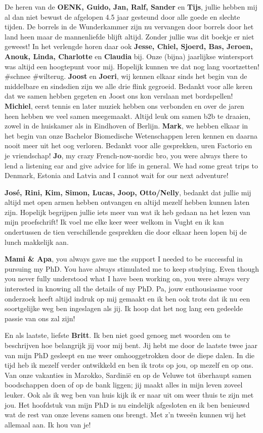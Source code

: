 De heren van de \textbf{OENK, Guido, Jan, Ralf, Sander} en \textbf{Tijs}, jullie hebben mij al dan niet bewust de afgelopen 4.5 jaar gesteund door alle goede en slechte tijden. De borrels in de Wunderkammer zijn nu vervangen door borrels door het land heen maar de mannenliefde blijft altijd. Zonder jullie was dit boekje er niet geweest! In het verlengde horen daar ook \textbf{Jesse, Chiel, Sjoerd, Bas, Jeroen, Anouk, Linda, Charlotte} en \textbf{Claudia} bij. Onze (bijna) jaarlijkse wintersport was altijd een hoogtepunt voor mij. Hopelijk kunnen we dat nog lang voortzetten! \#schnee \#wilterug. \textbf{Joost} en \textbf{Joeri}, wij kennen elkaar sinds het begin van de middelbare en sindsdien zijn we alle drie flink gegroeid. Bedankt voor alle keren dat we samen hebben gegeten en Joost ons kon verslaan met bordspellen! \textbf{Michiel}, eerst tennis en later muziek hebben ons verbonden en over de jaren heen hebben we veel samen meegemaakt. Altijd leuk om samen b2b te draaien, zowel in de huiskamer als in Eindhoven of Berlijn. \textbf{Mark}, we hebben elkaar in het begin van onze Bachelor Biomedische Wetenschappen leren kennen en daarna nooit meer uit het oog verloren. Bedankt voor alle gesprekken, uren Factorio en je vriendschap! \textbf{Jo}, my crazy French-now-nordic bro, you were always there to lend a listening ear and give advice for life in general. We had some great trips to Denmark, Estonia and Latvia and I cannot wait for our next adventure! 

\textbf{José, Rini, Kim, Simon, Lucas, Joop, Otto/Nelly}, bedankt dat jullie mij altijd met open armen hebben ontvangen en altijd mezelf hebben kunnen laten zijn. Hopelijk begrijpen jullie iets meer van wat ik heb gedaan na het lezen van mijn proefschrift! Ik voel me elke keer weer welkom in Vught en ik kan ondertussen de tien verschillende gesprekken die door elkaar heen lopen bij de lunch makkelijk aan.

\textbf{Mami \& Apa}, you always gave me the support I needed to be successful in pursuing my PhD. You have always stimulated me to keep studying. Even though you never fully understood what I have been working on, you were always very interested in knowing all the details of my PhD. Pa, jouw enthousiasme voor onderzoek heeft altijd indruk op mij gemaakt en ik ben ook trots dat ik nu een soortgelijke weg ben ingeslagen als jij. Ik hoop dat het nog lang een gedeelde passie van ons zal zijn!

En als laatste, liefste \textbf{Britt}. Ik ben niet goed genoeg met woorden om te beschrijven hoe belangrijk jij voor mij bent. Jij hebt me door de laatste twee jaar van mijn PhD gesleept en me weer omhooggetrokken door de diepe dalen. In die tijd heb ik mezelf verder ontwikkeld en ben ik trots op jou, op mezelf en op ons. Van onze vakanties in Marokko, Sardinië en op de Veluwe tot überhaupt samen boodschappen doen of op de bank liggen; jij maakt alles in mijn leven zoveel leuker. Ook als ik weg ben van huis kijk ik er naar uit om weer thuis te zijn met jou. Het hoofdstuk van mijn PhD is nu eindelijk afgesloten en ik ben benieuwd wat de rest van onze levens samen ons brengt. Met z’n tweeën kunnen wij het allemaal aan. Ik hou van je! 


